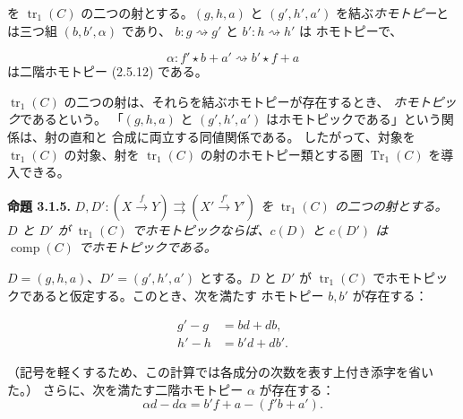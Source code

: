 \clearpage
{}%
を $\operatorname{tr}_1(C)$ の二つの射とする。$(g,h,a)$ と
$(g',h',a')$ を結ぶ\emph{ホモトピー}とは三つ組 $(b,b',\alpha)$ であり、
$b\colon g\rightsquigarrow g'$ と $b'\colon h\rightsquigarrow h'$ は
ホモトピーで、

\begin{equation*}
  \alpha\colon f'\star b+a'\rightsquigarrow b'\star f+a
\end{equation*}
は二階ホモトピー (2.5.12) である。

$\operatorname{tr}_1(C)$ の二つの射は、それらを結ぶホモトピーが存在するとき、
\emph{ホモトピック}であるという。
「$(g,h,a)$ と $(g',h',a')$ はホモトピックである」という関係は、射の直和と
合成に両立する同値関係である。
したがって、対象を $\operatorname{tr}_1(C)$ の対象、射を
$\operatorname{tr}_1(C)$ の射のホモトピー類とする圏
$\operatorname{Tr}_1(C)$ を導入できる。

\noindent\textbf{命題 3.1.5.}\quad
\emph{
$D,D'\colon (X\xrightarrow{f}Y)\rightrightarrows
(X'\xrightarrow{f'}Y')$ を $\operatorname{tr}_1(C)$ の二つの射とする。
$D$ と $D'$ が $\operatorname{tr}_1(C)$ でホモトピックならば、$c(D)$ と
$c(D')$ は $\operatorname{comp}(C)$ でホモトピックである。}

$D=(g,h,a)$、$D'=(g',h',a')$ とする。$D$ と $D'$ が
$\operatorname{tr}_1(C)$ でホモトピックであると仮定する。このとき、次を満たす
ホモトピー $b,b'$ が存在する：

\begin{equation}
  \begin{aligned}
    g'-g&=bd+db,\\
    h'-h&=b'd+db'.
  \end{aligned}
  \tag{3.1.5.1}
\end{equation}

（記号を軽くするため、この計算では各成分の次数を表す上付き添字を省いた。）
さらに、次を満たす二階ホモトピー $\alpha$ が存在する：
\begin{equation*}
  \alpha d-d\alpha=b'f+a-(f'b+a').
\end{equation*}

